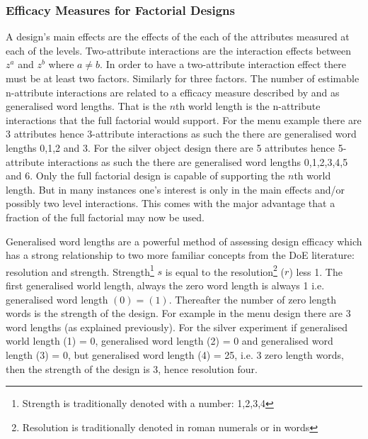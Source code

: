 \documentclass[article, crop=false]{standalone}
\begin{document}
\subsubsection{Efficacy Measures for Factorial Designs}

A design's main effects are the effects of the each of the attributes measured at each of the levels.
Two-attribute interactions are the interaction effects between $z^a$ and $z^b$ where $a \neq b$.
In order to have a two-attribute interaction effect there must be at least two factors.
Similarly for three factors.
The number of estimable n-attribute interactions are related to a efficacy measure described by \citet{xu2001generalized} and \citet{gromping2014generalized} as generalised word lengths.
That is the $n$th world length is the n-attribute interactions that the full factorial would support.
For the menu example there are 3 attributes hence 3-attribute interactions as such the there are generalised word lengths 0,1,2 and 3.
For the silver object design there are 5 attributes hence 5-attribute interactions as such the there are generalised word lengths 0,1,2,3,4,5 and 6.
Only the full factorial design is capable of supporting the $n$th world length.
But in many instances one's interest is only in the main effects and/or possibly two level interactions.
This comes with the major advantage that a fraction of the full factorial may now be used.

Generalised word lengths are a powerful method of assessing design efficacy which has a strong relationship to two more familiar concepts from the DoE literature: resolution and strength.
Strength\footnote{Strength is traditionally denoted with a number: 1,2,3,4} $s$ is equal to the resolution\footnote{Resolution is traditionally denoted in roman numerals or in words} ($r$) less 1.
The first generalised world length, always the zero word length is always 1 i.e. generalised word length $(0) = (1)$.
Thereafter the number of zero length words is the strength of the design.
For example in the menu design there are 3 word lengths (as explained previously).
For the silver experiment if generalised world length (1) = 0, generalised word length (2) = 0 and generalised word length (3) = 0, but generalised word length (4) = 25, i.e. 3 zero length words, then the strength of the design is 3, hence resolution four.
\end{document}
